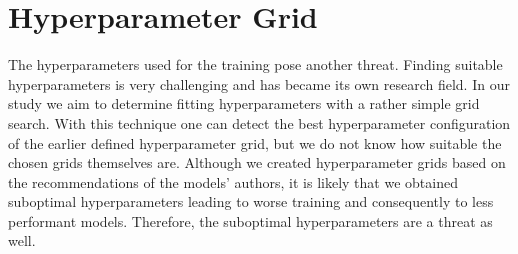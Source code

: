 \section{Hyperparameter Grid}
\label{chp:threats_to_validity:sec:hyperparameter_grid}

The hyperparameters used for the training pose another threat.
Finding suitable hyperparameters is very challenging \parencite{Zeiler:2012} and has became its own research field.
In our study we aim to determine fitting hyperparameters with a rather simple grid search.
With this technique one can detect the best hyperparameter configuration of the earlier defined hyperparameter grid, but we do not know how suitable the chosen grids themselves are.
Although we created hyperparameter grids based on the recommendations of the models' authors, it is likely that we obtained suboptimal hyperparameters leading to worse training and consequently to less performant models.
Therefore, the suboptimal hyperparameters are a threat as well.
